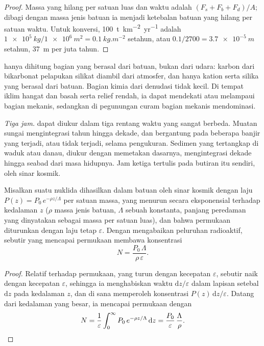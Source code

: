 \begin{proof}
Massa yang hilang per satuan luas dan waktu adalah $(F_s + F_b + F_d)/A$; dibagi dengan
massa jenis batuan ia menjadi ketebalan batuan yang hilang per satuan waktu. Untuk konversi,
\qty{100}{t.km^{-2}.yr^{-1}} adalah
$\qty{1e5}{kg}/\qty{1e6}{m^2} = \qty{0.1}{kg.m^{-2}}$ setahun, atau
$0.1/2700 = \qty{3.7e-5}{m}$ setahun, \qty{37}{m} per juta tahun.
\end{proof}

 hanya dihitung bagian yang berasal dari batuan, bukan dari udara: karbon dari bikarbonat pelapukan silikat diambil dari atmosfer, dan hanya kation serta silika yang berasal dari batuan. Bagian kimia dari denudasi tidak kecil. Di tempat iklim hangat dan basah serta relief rendah, ia dapat mendekati atau melampaui bagian mekanis, sedangkan di pegunungan curam bagian mekanis mendominasi.

\emph{Tiga jam.}  dapat diukur dalam tiga rentang waktu yang sangat berbeda. Muatan sungai mengintegrasi tahun hingga dekade, dan bergantung pada beberapa banjir yang terjadi, atau tidak terjadi, selama pengukuran. Sedimen yang tertangkap di waduk atau danau, diukur dengan memetakan dasarnya, mengintegrasi dekade hingga seabad dari masa hidupnya. Jam ketiga tertulis pada butiran itu sendiri, oleh sinar kosmik.

\begin{proposition}\label{prop:b1:erosion-transport:cosmogenic}
Misalkan suatu nuklida dihasilkan dalam batuan oleh sinar kosmik dengan laju
$P(z) = P_0\,e^{-\rho z/\Lambda}$ per satuan massa, yang menurun secara eksponensial terhadap
kedalaman $z$ ($\rho$ massa jenis batuan, $\Lambda$ sebuah konstanta, panjang peredaman
yang dinyatakan sebagai massa per satuan luas), dan bahwa permukaan diturunkan dengan laju tetap $\varepsilon$. Dengan mengabaikan peluruhan radioaktif, sebutir
yang mencapai permukaan membawa konsentrasi
\[
  N = \frac{P_0\,\Lambda}{\rho\,\varepsilon}.
\]
\end{proposition}

\begin{proof}
Relatif terhadap permukaan, yang turun dengan kecepatan $\varepsilon$, sebutir naik dengan kecepatan $\varepsilon$, sehingga ia menghabiskan waktu $\mathrm dz/\varepsilon$
dalam lapisan setebal $\mathrm dz$ pada kedalaman $z$, dan di sana memperoleh
konsentrasi $P(z)\,\mathrm dz/\varepsilon$. Datang dari kedalaman yang besar, ia mencapai permukaan dengan
\[
  N = \frac{1}{\varepsilon}\int_0^{\infty} P_0\,e^{-\rho z/\Lambda}\,\mathrm dz
  = \frac{P_0}{\varepsilon}\,\frac{\Lambda}{\rho}. \qedhere
\]
\end{proof}

